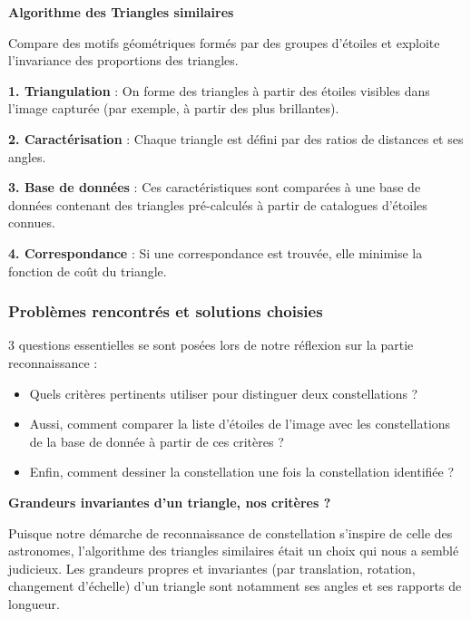 \vspace{0.4cm}

\noindent \textbf{Algorithme des Triangles similaires}

Compare des motifs géométriques formés par des groupes d'étoiles et exploite l'invariance des proportions des triangles.

\textbf{1. Triangulation} : On forme des triangles à partir des étoiles visibles dans l'image capturée (par exemple, à partir des plus brillantes).

\textbf{2. Caractérisation} : Chaque triangle est défini par des ratios de distances et ses angles.

\textbf{3. Base de données} : Ces caractéristiques sont comparées à une base de données contenant des triangles pré-calculés à partir de catalogues d'étoiles connues.

\textbf{4. Correspondance} : Si une correspondance est trouvée, elle minimise la fonction de coût du triangle.

\subsubsection{Problèmes rencontrés et solutions choisies}

3 questions essentielles se sont posées lors de notre réflexion sur la partie reconnaissance :

\begin{itemize}
    \item Quels critères pertinents utiliser pour distinguer deux constellations ?
    \item Aussi, comment comparer la liste d'étoiles de l'image avec les constellations de la base de donnée à partir de ces critères ? 
    \item Enfin, comment dessiner la constellation une fois la constellation identifiée ?
\end{itemize}

\vspace{0.2cm}

\noindent \textbf{Grandeurs invariantes d'un triangle, nos critères ?}

Puisque notre démarche de reconnaissance de constellation s'inspire de celle des astronomes, l'algorithme des triangles similaires était un choix qui nous a semblé judicieux. Les grandeurs propres et invariantes (par translation, rotation, changement d'échelle) d'un triangle sont notamment ses angles et ses rapports de longueur.


